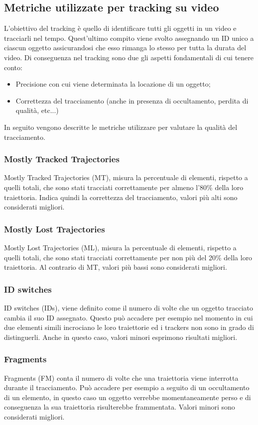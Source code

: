 \subsection{Metriche utilizzate per tracking su video}
L'obiettivo del tracking è quello di identificare tutti gli oggetti in un video e tracciarli nel tempo. Quest'ultimo compito viene svolto assegnando un ID unico a ciascun oggetto assicurandosi che esso rimanga lo stesso per tutta la durata del video. Di conseguenza nel tracking sono due gli aspetti fondamentali di cui tenere conto:
\begin{itemize}
\item Precisione con cui viene determinata la locazione di un oggetto;
\item Correttezza del tracciamento (anche in presenza di occultamento, perdita di qualità, etc...)
\end{itemize}
In seguito vengono descritte le metriche utilizzare per valutare la qualità del tracciamento.

\subsubsection{Mostly Tracked Trajectories}
Mostly Tracked Trajectories (MT), misura la percentuale di elementi, rispetto a quelli totali, che sono stati tracciati correttamente per almeno l'80\% della loro traiettoria. Indica quindi la correttezza del tracciamento, valori più alti sono considerati migliori.
\subsubsection{Mostly Lost Trajectories}
Mostly Lost Trajectories (ML), misura la percentuale di elementi, rispetto a quelli totali, che sono stati tracciati correttamente per non più del 20\% della loro traiettoria. Al contrario di MT, valori più bassi sono considerati migliori.
\subsubsection{ID switches}
ID switches (IDs), viene definito come il numero di volte che un oggetto tracciato cambia il suo ID assegnato. Questo può accadere per esempio nel momento in cui due elementi simili incrociano le loro traiettorie ed i trackers non sono in grado di distinguerli. Anche in questo caso, valori minori esprimono risultati migliori.
\subsubsection{Fragments}
Fragments (FM) conta il numero di volte che una traiettoria viene interrotta durante il tracciamento. Può accadere per esempio a seguito di un occultamento di un elemento, in questo caso un oggetto verrebbe momentaneamente perso e di conseguenza la sua traiettoria risulterebbe frammentata. Valori minori sono considerati migliori. 
